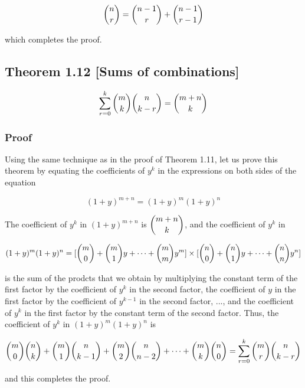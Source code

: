 \documentclass{article}
\begin{document}
\[\dbinom n r = \dbinom {n-1} r + \dbinom {n-1} {r-1}\]

which completes the proof.

\subsection*{Theorem 1.12 [Sums of combinations]}

\[
\sum^k_{r=0} \dbinom m k \dbinom n {k-r} = \dbinom {m+n} k 
\]

\subsubsection*{Proof} Using the same technique as in the proof of Theorem 1.11, let us prove this theorem by equating the coefficients of \(y^k\) in the expressions on both sides of the equation

\[(1+y)^{m+n}=(1+y)^m(1+y)^n\]

The coefficient of \(y^k\) in \((1+y)^{m+n}\) is \(\dbinom {m+n} k\), and the coefficient of \(y^k\) in 

\[(1+y)^m(1+y)^n = [ \dbinom m 0 + \dbinom m 1 y + \cdots + \dbinom m m y^m ] \times [ \dbinom n 0 + \dbinom n 1 y + \cdots + \dbinom n n y^n ] \]

is the sum of the prodcts that we obtain by multiplying the constant term of the first factor by the coefficient of \(y^k\) in the second factor, the coefficient of \(y\) in the first factor by the coefficient of \(y^{k-1}\) in the second factor, ..., and the coefficient of \(y^k\) in the first factor by the constant term of the second factor. Thus, the coefficient of \(y^k\) in \((1+y)^m(1+y)^n\) is

\[
\dbinom m 0 \dbinom n k + \dbinom m 1 \dbinom n {k-1} + \dbinom m 2 \dbinom n {n-2} + \cdots + \dbinom m k \dbinom n 0 = \sum^k_{r=0} \dbinom m r \dbinom n {k-r}
\]

and this completes the proof.
\end{document}
